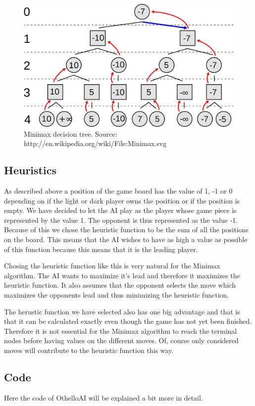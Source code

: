 \documentclass[a4paper]{article}
\begin{document}
\begin{figure}[h!]
  \centering
    \includegraphics[width=1\textwidth]{Minimax.png}
  \caption{Minimax decision tree. Source: http://en.wikipedia.org/wiki/File:Minimax.svg}
  \label{minimax}
\end{figure}

\subsection{Heuristics}
As described above a position of the game board has the value of 1, -1 or 0 depending on if the light or dark player owns the position or if the position is empty. We have decided to let the AI play as the player whose game piece is represented by the value 1. The opponent is thus represented as the value -1. Because of this we chose the heuristic function to be the sum of all the positions on the board. This means that the AI wishes to have as high a value as possible of this function because this means that it is the leading player.

Chosing the heuristic function like this is very natural for the Minimax algorithm. The AI wants to maximize it's lead and therefore it maximizes the heuristic function. It also assumes that the opponent selects the move which maximizes the opponents lead and thus minimizing the heuristic function.

The herustic function we have selected also has one big advantage and that is that it can be calculated exactly even though the game has not yet been finished. Therefore it is not essential for the Minimax algorithm to reach the terminal nodes before having values on the different moves. Of, course only considered moves will contribute to the heuristic function this way.

\subsection{Code}
Here the code of OthelloAI will be explained a bit more in detail. 
\end{document}
